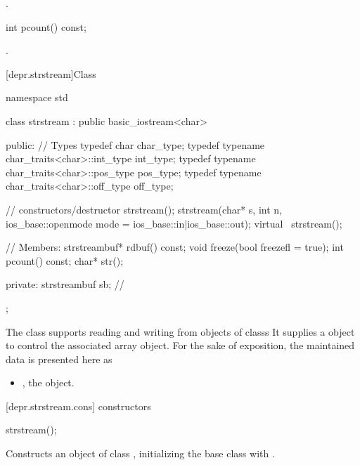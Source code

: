 \begin{itemdescr}
\pnum
\returns
{}.
\end{itemdescr}

%
\begin{itemdecl}
int pcount() const;
\end{itemdecl}

\begin{itemdescr}
\pnum
\returns
{}.
\end{itemdescr}

[depr.strstream]{Class }

%
\begin{codeblock}
namespace std {
  class strstream
    : public basic_iostream<char> {
  public:
    // Types
    typedef char                                char_type;
    typedef typename char_traits<char>::int_type int_type;
    typedef typename char_traits<char>::pos_type pos_type;
    typedef typename char_traits<char>::off_type off_type;

    // constructors/destructor
    strstream();
    strstream(char* s, int n,
              ios_base::openmode mode = ios_base::in|ios_base::out);
    virtual ~strstream();

    // Members:
    strstreambuf* rdbuf() const;
    void freeze(bool freezefl = true);
    int pcount() const;
    char* str();

  private:
  strstreambuf sb;  // \expos
  };
}
\end{codeblock}

\pnum
The class
supports reading and writing from objects of classs
It supplies a
object to control the associated array object.
For the sake of exposition, the maintained data is presented here as
\begin{itemize}
\item
{}, the
object.
\end{itemize}

[depr.strstream.cons]{ constructors}

%
\begin{itemdecl}
strstream();
\end{itemdecl}

\begin{itemdescr}
\pnum
\effects
Constructs an object of class
,
initializing the base class with
.
\end{itemdescr}

